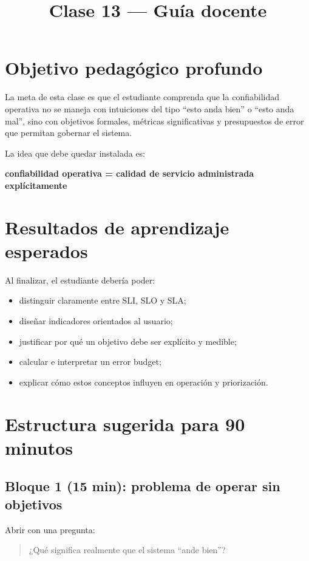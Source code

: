 \documentclass[variant=docente,cover=institutional,mode=screen]{ua-engineering-v6-article}
\title{Clase 13 --- Guía docente}
\author{\UAProfessor}
\date{\UADate}
\begin{document}
\maketitle

\section{Objetivo pedagógico profundo}

La meta de esta clase es que el estudiante comprenda que la confiabilidad operativa no se maneja con intuiciones del tipo “esto anda bien” o “esto anda mal”, sino con objetivos formales, métricas significativas y presupuestos de error que permitan gobernar el sistema.

La idea que debe quedar instalada es:

\begin{center}
\textbf{confiabilidad operativa = calidad de servicio administrada explícitamente}
\end{center}

\section{Resultados de aprendizaje esperados}

Al finalizar, el estudiante debería poder:

\begin{itemize}
\item distinguir claramente entre SLI, SLO y SLA;
\item diseñar indicadores orientados al usuario;
\item justificar por qué un objetivo debe ser explícito y medible;
\item calcular e interpretar un error budget;
\item explicar cómo estos conceptos influyen en operación y priorización.
\end{itemize}

\section{Estructura sugerida para 90 minutos}

\subsection*{Bloque 1 (15 min): problema de operar sin objetivos}
Abrir con una pregunta:
\begin{quote}
¿Qué significa realmente que el sistema “ande bien”?
\end{quote}
\end{document}
